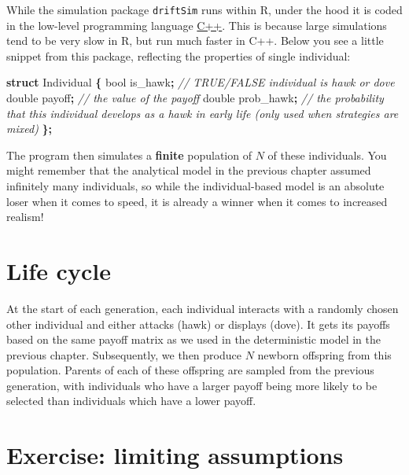 \documentclass[
]{book}
\newenvironment{Shaded}{\begin{snugshade}}{\end{snugshade}}
\newcommand{\CommentTok}[1]{\textcolor[rgb]{0.56,0.35,0.01}{\textit{#1}}}
\newcommand{\DataTypeTok}[1]{\textcolor[rgb]{0.13,0.29,0.53}{#1}}
\newcommand{\KeywordTok}[1]{\textcolor[rgb]{0.13,0.29,0.53}{\textbf{#1}}}
\newcommand{\NormalTok}[1]{#1}
\newcommand{\OperatorTok}[1]{\textcolor[rgb]{0.81,0.36,0.00}{\textbf{#1}}}
\begin{document}
While the simulation package \texttt{driftSim} runs within R, under the hood it is coded in the low-level programming language \href{https://cplusplus.com/doc/tutorial/}{C++}. This is because large simulations tend to be very slow in R, but run much faster in C++. Below you see a little snippet from this package, reflecting the properties of single individual:

\begin{Shaded}
\begin{Highlighting}[]
\KeywordTok{struct}\NormalTok{ Individual }\OperatorTok{\{}
    \DataTypeTok{bool}\NormalTok{ is\_hawk}\OperatorTok{;} \CommentTok{// TRUE/FALSE individual is hawk or dove}
    \DataTypeTok{double}\NormalTok{ payoff}\OperatorTok{;} \CommentTok{// the value of the payoff}
    \DataTypeTok{double}\NormalTok{ prob\_hawk}\OperatorTok{;} \CommentTok{// the probability that this individual develops as a hawk in early life (only used when strategies are mixed)}
\OperatorTok{\};}
\end{Highlighting}
\end{Shaded}

The program then simulates a \textbf{finite} population of \(N\) of these individuals. You might remember that the analytical model in the previous chapter assumed infinitely many individuals, so while the individual-based model is an absolute loser when it comes to speed, it is already a winner when it comes to increased realism!

\hypertarget{life-cycle-1}{%
\section{Life cycle}\label{life-cycle-1}}

At the start of each generation, each individual interacts with a randomly chosen other individual and either attacks (hawk) or displays (dove). It gets its payoffs based on the same payoff matrix as we used in the deterministic model in the previous chapter. Subsequently, we then produce \(N\) newborn offspring from this population. Parents of each of these offspring are sampled from the previous generation, with individuals who have a larger payoff being more likely to be selected than individuals which have a lower payoff.

\hypertarget{exercise-limiting-assumptions}{%
\section{Exercise: limiting assumptions}\label{exercise-limiting-assumptions}}
\end{document}
